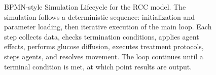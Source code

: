 \begin{figure}[htbp]
\caption{BPMN-style Simulation Lifecycle for the RCC model. The simulation follows a deterministic sequence: initialization and parameter loading, then iterative execution of the main loop. Each step collects data, checks termination conditions, applies agent effects, performs glucose diffusion, executes treatment protocols, steps agents, and resolves movement. The loop continues until a terminal condition is met, at which point results are output.}
\label{fig:simulation_pipeline}
\end{figure}
